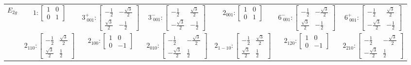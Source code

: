 \documentclass[fleqn,8pt,landscape]{jsarticle}
\begin{document}
\begin{longtable}{ccccccc}
$ E_{2g} $ & $ 1:\begin{bmatrix} 1 & 0 \\ 0 & 1 \end{bmatrix} $ & $ 3^{+}_{\,\,001}:\begin{bmatrix} - \frac{1}{2} & - \frac{\sqrt{3}}{2} \\ \frac{\sqrt{3}}{2} & - \frac{1}{2} \end{bmatrix} $ & $ 3^{-}_{\,\,001}:\begin{bmatrix} - \frac{1}{2} & \frac{\sqrt{3}}{2} \\ - \frac{\sqrt{3}}{2} & - \frac{1}{2} \end{bmatrix} $ & $ 2{}_{001}:\begin{bmatrix} 1 & 0 \\ 0 & 1 \end{bmatrix} $ & $ 6^{-}_{\,\,001}:\begin{bmatrix} - \frac{1}{2} & - \frac{\sqrt{3}}{2} \\ \frac{\sqrt{3}}{2} & - \frac{1}{2} \end{bmatrix} $ & $ 6^{+}_{\,\,001}:\begin{bmatrix} - \frac{1}{2} & \frac{\sqrt{3}}{2} \\ - \frac{\sqrt{3}}{2} & - \frac{1}{2} \end{bmatrix} $ \\
& $ 2{}_{110}:\begin{bmatrix} - \frac{1}{2} & \frac{\sqrt{3}}{2} \\ \frac{\sqrt{3}}{2} & \frac{1}{2} \end{bmatrix} $ & $ 2{}_{100}:\begin{bmatrix} 1 & 0 \\ 0 & -1 \end{bmatrix} $ & $ 2{}_{010}:\begin{bmatrix} - \frac{1}{2} & - \frac{\sqrt{3}}{2} \\ - \frac{\sqrt{3}}{2} & \frac{1}{2} \end{bmatrix} $ & $ 2{}_{1-10}:\begin{bmatrix} - \frac{1}{2} & \frac{\sqrt{3}}{2} \\ \frac{\sqrt{3}}{2} & \frac{1}{2} \end{bmatrix} $ & $ 2{}_{120}:\begin{bmatrix} 1 & 0 \\ 0 & -1 \end{bmatrix} $ & $ 2{}_{210}:\begin{bmatrix} - \frac{1}{2} & - \frac{\sqrt{3}}{2} \\ - \frac{\sqrt{3}}{2} & \frac{1}{2} \end{bmatrix} $ \\

\end{longtable}
\end{document}
